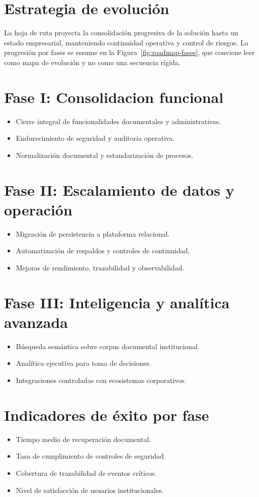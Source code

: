 \section{Estrategia de evolución}
La hoja de ruta proyecta la consolidación progresiva de la solución hasta un estado empresarial, manteniendo continuidad operativa y control de riesgos.
La progresión por fases se resume en la Figura~\ref{fig:roadmap-fases}, que conviene leer como mapa de evolución y no como una secuencia rígida.

\section{Fase I: Consolidacion funcional}
\begin{itemize}
  \item Cierre integral de funcionalidades documentales y administrativas.
  \item Endurecimiento de seguridad y auditoría operativa.
  \item Normalización documental y estandarización de procesos.
\end{itemize}

\section{Fase II: Escalamiento de datos y operación}
\begin{itemize}
  \item Migración de persistencia a plataforma relacional.
  \item Automatización de respaldos y controles de continuidad.
  \item Mejoras de rendimiento, trazabilidad y observabilidad.
\end{itemize}

\section{Fase III: Inteligencia y analítica avanzada}
\begin{itemize}
  \item Búsqueda semántica sobre corpus documental institucional.
  \item Analítica ejecutiva para toma de decisiones.
  \item Integraciones controladas con ecosistemas corporativos.
\end{itemize}

\section{Indicadores de éxito por fase}
\begin{itemize}
  \item Tiempo medio de recuperación documental.
  \item Tasa de cumplimiento de controles de seguridad.
  \item Cobertura de trazabilidad de eventos críticos.
  \item Nivel de satisfacción de usuarios institucionales.
\end{itemize}

